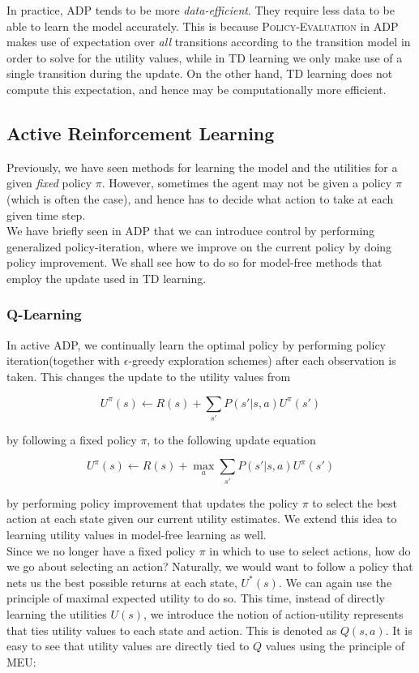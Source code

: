 \documentclass[11pt]{article}
\begin{document}
In practice, ADP tends to be more \textit{data-efficient}. They require less data to be able to learn the model accurately. This is because \textsc{Policy-Evaluation} in ADP makes use of expectation over \textit{all} transitions according to the transition model in order to solve for the utility values, while in TD learning we only make use of a single transition during the update. On the other hand, TD learning does not compute this expectation, and hence may be computationally more efficient.

\subsection{Active Reinforcement Learning}

Previously, we have seen methods for learning the model and the utilities for a given \textit{fixed} policy $\pi$. However, sometimes the agent may not be given a policy $\pi$(which is often the case), and hence has to decide what action to take at each given time step.\\

We have briefly seen in ADP that we can introduce control by performing generalized policy-iteration, where we improve on the current policy by doing policy improvement. We shall see how to do so for model-free methods that employ the update used in TD learning.

\subsubsection{Q-Learning}

In active ADP, we continually learn the optimal policy by performing policy iteration(together with $\epsilon$-greedy exploration schemes) after each observation is taken. This changes the update to the utility values from

$$
U^{\pi}(s) \leftarrow R(s) + \sum_{s'} P(s' | s, a) U^{\pi}(s')
$$

by following a fixed policy $\pi$, to the following update equation

$$
U^{\pi}(s) \leftarrow R(s) + \max_a \sum_{s'} P(s' | s, a) U^{\pi}(s')
$$

by performing policy improvement that updates the policy $\pi$ to select the best action at each state given our current utility estimates. We extend this idea to learning utility values in model-free learning as well. \\

Since we no longer have a fixed policy $\pi$ in which to use to select actions, how do we go about selecting an action? Naturally, we would want to follow a policy that nets us the best possible returns at each state, $U^*(s)$. We can again use the principle of maximal expected utility to do so. This time, instead of directly learning the utilities $U(s)$, we introduce the notion of action-utility represents that ties utility values to each state and action. This is denoted as $Q(s, a)$. It is easy to see that utility values are directly tied to $Q$ values using the principle of MEU:
\end{document}
